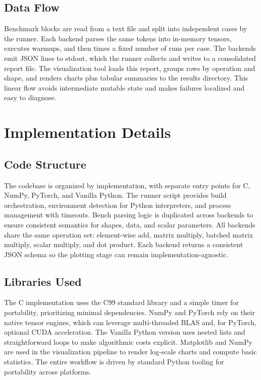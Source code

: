 \documentclass[a4paper,12pt]{article}
\begin{document}
\subsection{Data Flow}
Benchmark blocks are read from a text file and split into independent cases by the runner. Each backend parses the same tokens into in-memory tensors, executes warmups, and then times a fixed number of runs per case. The backends emit JSON lines to stdout, which the runner collects and writes to a consolidated report file. The visualization tool loads this report, groups rows by operation and shape, and renders charts plus tabular summaries to the results directory. This linear flow avoids intermediate mutable state and makes failures localized and easy to diagnose.

\section{Implementation Details}
\subsection{Code Structure}
The codebase is organized by implementation, with separate entry points for C, NumPy, PyTorch, and Vanilla Python. The runner script provides build orchestration, environment detection for Python interpreters, and process management with timeouts. Bench parsing logic is duplicated across backends to ensure consistent semantics for shapes, data, and scalar parameters. All backends share the same operation set: element-wise add, matrix multiply, batched matrix multiply, scalar multiply, and dot product. Each backend returns a consistent JSON schema so the plotting stage can remain implementation-agnostic.

\subsection{Libraries Used}
The C implementation uses the C99 standard library and a simple timer for portability, prioritizing minimal dependencies. NumPy and PyTorch rely on their native tensor engines, which can leverage multi-threaded BLAS and, for PyTorch, optional CUDA acceleration. The Vanilla Python version uses nested lists and straightforward loops to make algorithmic costs explicit. Matplotlib and NumPy are used in the visualization pipeline to render log-scale charts and compute basic statistics. The entire workflow is driven by standard Python tooling for portability across platforms.
\end{document}
